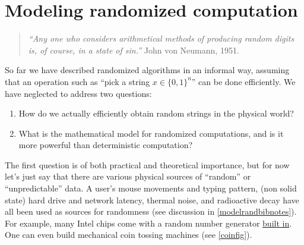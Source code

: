 \chapter{Modeling randomized computation}\label{chapmodelrand}


\begin{quote}
\emph{``Any one who considers arithmetical methods of producing random
digits is, of course, in a state of sin.''} John von Neumann, 1951.
\end{quote}

So far we have described randomized algorithms in an informal way,
assuming that an operation such as ``pick a string \(x\in \{0,1\}^n\)''
can be done efficiently. We have neglected to address two questions:

\begin{enumerate}
\def\labelenumi{\arabic{enumi}.}
\item
  How do we actually efficiently obtain random strings in the physical
  world?
\item
  What is the mathematical model for randomized computations, and is it
  more powerful than deterministic computation?
\end{enumerate}

The first question is of both practical and theoretical importance, but
for now let's just say that there are various physical sources of
``random'' or ``unpredictable'' data. A user's mouse movements and
typing pattern, (non solid state) hard drive and network latency,
thermal noise, and radioactive decay have all been used as sources for
randomness (see discussion in \cref{modelrandbibnotes}). For example,
many Intel chips come with a random number generator
\href{http://spectrum.ieee.org/computing/hardware/behind-intels-new-randomnumber-generator}{built
in}. One can even build mechanical coin tossing machines (see
\cref{coinfig}).


